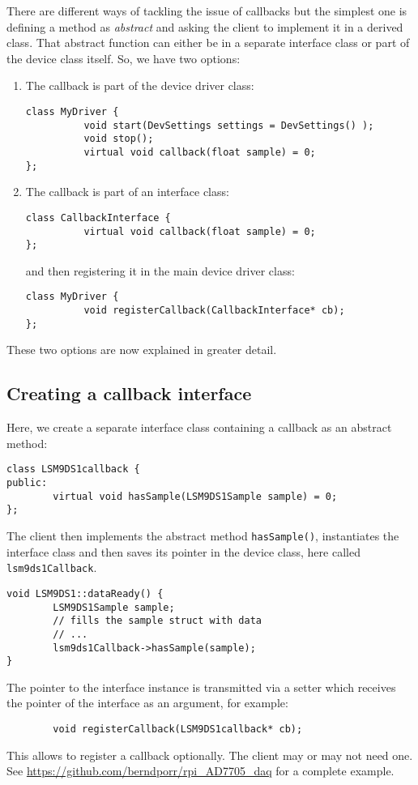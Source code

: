 \documentclass[12pt]{report}
\begin{document}
There are different ways of tackling the issue of callbacks but the
simplest one is defining a method as \textsl{abstract} and asking the
client to implement it in a derived class. That abstract function can
either be in a separate interface class or part of the device class
itself. So, we have two options:
\begin{enumerate}
\item The callback is part of the device driver class:
\begin{verbatim}
class MyDriver {
          void start(DevSettings settings = DevSettings() );
          void stop();
          virtual void callback(float sample) = 0;
};
\end{verbatim}
\item The callback is part of an interface class:
\begin{verbatim}
class CallbackInterface {
          virtual void callback(float sample) = 0;
};
\end{verbatim}
and then registering it in the main device driver class:
\begin{verbatim}
class MyDriver {
          void registerCallback(CallbackInterface* cb);
};
\end{verbatim}
\end{enumerate}
These two options are now explained in greater detail.


\subsection{Creating a callback interface}
Here, we create a separate interface class containing a callback
as an abstract method:
\begin{verbatim}
class LSM9DS1callback {
public:
        virtual void hasSample(LSM9DS1Sample sample) = 0;
};
\end{verbatim}

The client then implements the abstract method \texttt{hasSample()}, instantiates
the interface class and then saves its pointer in the device class, here called \texttt{lsm9ds1Callback}.
\begin{verbatim}
void LSM9DS1::dataReady() {
        LSM9DS1Sample sample;
        // fills the sample struct with data
        // ...
        lsm9ds1Callback->hasSample(sample);
}
\end{verbatim}
The pointer to the interface instance is transmitted via a setter which
receives the pointer of the interface as an argument, for example:
\begin{verbatim}
        void registerCallback(LSM9DS1callback* cb);
\end{verbatim}
This allows to register a callback optionally. The client may or may not need
one.
See
\url{https://github.com/berndporr/rpi_AD7705_daq}
for a complete example.
\end{document}
